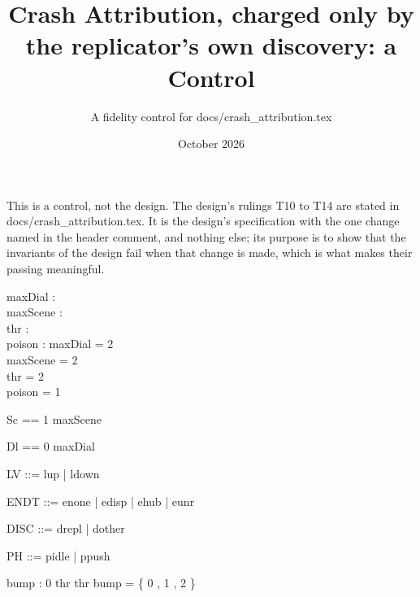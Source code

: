 \documentclass[a4paper,10pt,fleqn]{article}
\begin{document}
\title{Crash Attribution, charged only by the replicator's own discovery: a Control}
\author{A fidelity control for docs/crash\_attribution.tex}
\date{October 2026}
\maketitle

This is a control, not the design.  The design's rulings T10 to T14 are stated in docs/crash_attribution.tex.  It is the design's
specification with the one change named in the header comment, and nothing
else; its purpose is to show that the invariants of the design fail when
that change is made, which is what makes their passing meaningful.

\begin{axdef}
  maxDial : \nat \\
  maxScene : \nat \\
  thr : \nat \\
  poison : \nat
\where
  maxDial = 2 \\
  maxScene = 2 \\
  thr = 2 \\
  poison = 1
\end{axdef}

\begin{zed}
  Sc == 1 \upto maxScene
\end{zed}

\begin{zed}
  Dl == 0 \upto maxDial
\end{zed}

\begin{zed}
  LV ::= lup | ldown
\end{zed}

\begin{zed}
  ENDT ::= enone | edisp | ehub | eunr
\end{zed}

\begin{zed}
  DISC ::= drepl | dother
\end{zed}

\begin{zed}
  PH ::= pidle | ppush
\end{zed}

\begin{axdef}
  bump : 0 \upto thr  \upto thr
\where
  bump = \{ 0 , 1 , 2  \}
\end{axdef}
\end{document}
